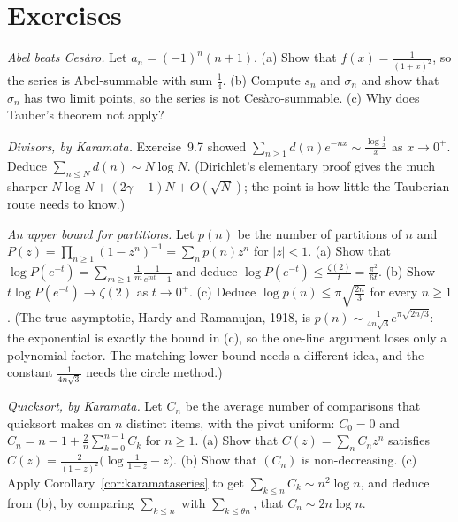 \section{Exercises}

\begin{exercise}[$\star$]\label{ex:cesaroabel}
\emph{Abel beats Ces\`aro.} Let $a_n=(-1)^n(n+1)$. (a) Show that $f(x)=\frac1{(1+x)^2}$, so the series is Abel-summable with sum $\frac14$. (b) Compute
$s_n$ and $\sigma_n$ and show that $\sigma_n$ has two limit points, so the series is not Ces\`aro-summable. (c) Why does Tauber's theorem not apply?
\end{exercise}

\begin{exercise}[$\star$]\label{ex:divisorkaramata}
\emph{Divisors, by Karamata.} Exercise~9.7 showed $\sum_{n\ge1}d(n)e^{-nx}\sim\frac{\log\frac1x}x$ as $x\to0^+$. Deduce $\sum_{n\le N}d(n)\sim N\log N$.
(Dirichlet's elementary proof gives the much sharper $N\log N+(2\gamma-1)N+O(\sqrt N)$; the point is how little the Tauberian route needs to know.)
\end{exercise}

\begin{exercise}[$\star\star$]\label{ex:partitionsup}
\emph{An upper bound for partitions.} Let $p(n)$ be the number of partitions of $n$ and $P(z)=\prod_{n\ge1}(1-z^n)^{-1}=\sum_np(n)z^n$ for $|z|<1$.
(a) Show that $\log P(e^{-t})=\sum_{m\ge1}\frac1m\frac1{e^{mt}-1}$ and deduce $\log P(e^{-t})\le\frac{\zeta(2)}t=\frac{\pi^2}{6t}$. (b) Show
$t\log P(e^{-t})\to\zeta(2)$ as $t\to0^+$. (c) Deduce $\log p(n)\le\pi\sqrt{\frac{2n}3}$ for every $n\ge1$. (The true asymptotic, Hardy and Ramanujan, 1918, is
$p(n)\sim\frac1{4n\sqrt3}e^{\pi\sqrt{2n/3}}$: the exponential is exactly the bound in (c), so the one-line argument loses only a polynomial factor. The
matching lower bound needs a different idea, and the constant $\frac1{4n\sqrt3}$ needs the circle method.)
\end{exercise}

\begin{exercise}[$\star\star$]\label{ex:quicksort}
\emph{Quicksort, by Karamata.} Let $C_n$ be the average number of comparisons that quicksort makes on $n$ distinct items, with the pivot uniform:
$C_0=0$ and $C_n=n-1+\frac2n\sum_{k=0}^{n-1}C_k$ for $n\ge1$. (a) Show that $C(z)=\sum_nC_nz^n$ satisfies $C(z)=\frac{2}{(1-z)^2}\bigl(\log\frac1{1-z}-z\bigr)$.
(b) Show that $(C_n)$ is non-decreasing. (c) Apply Corollary~\ref{cor:karamataseries} to get $\sum_{k\le n}C_k\sim n^2\log n$, and deduce from (b), by
comparing $\sum_{k\le n}$ with $\sum_{k\le\theta n}$, that $C_n\sim2n\log n$.
\end{exercise}

